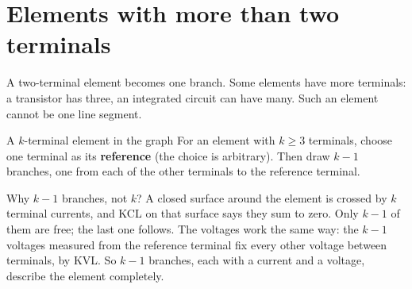 \documentclass[11pt,a4paper]{article}
\begin{document}
\section{Elements with more than two terminals}

A two-terminal element becomes one branch. Some elements have more terminals: a
transistor has three, an integrated circuit can have many. Such an element cannot be one
line segment.

\begin{definitionbox}{A $k$-terminal element in the graph}
For an element with $k \ge 3$ terminals, choose one terminal as its \textbf{reference}
(the choice is arbitrary). Then draw $k-1$ branches, one from each of the other terminals
to the reference terminal.
\end{definitionbox}

Why $k-1$ branches, not $k$? A closed surface around the element is crossed by $k$
terminal currents, and KCL on that surface says they sum to zero. Only $k-1$ of them are
free; the last one follows. The voltages work the same way: the $k-1$ voltages measured
from the reference terminal fix every other voltage between terminals, by KVL. So $k-1$
branches, each with a current and a voltage, describe the element completely.
\end{document}
